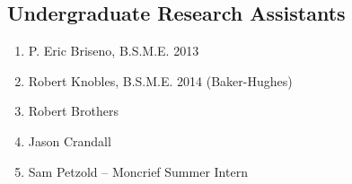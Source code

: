 \subsection*{Undergraduate Research Assistants}
  \begin{enumerate}
    \item P. Eric Briseno, B.S.M.E. 2013
    \item Robert Knobles, B.S.M.E. 2014 (Baker-Hughes)
    \item Robert Brothers
    \item Jason Crandall
    \item Sam Petzold -- Moncrief Summer Intern
  \end{enumerate}


